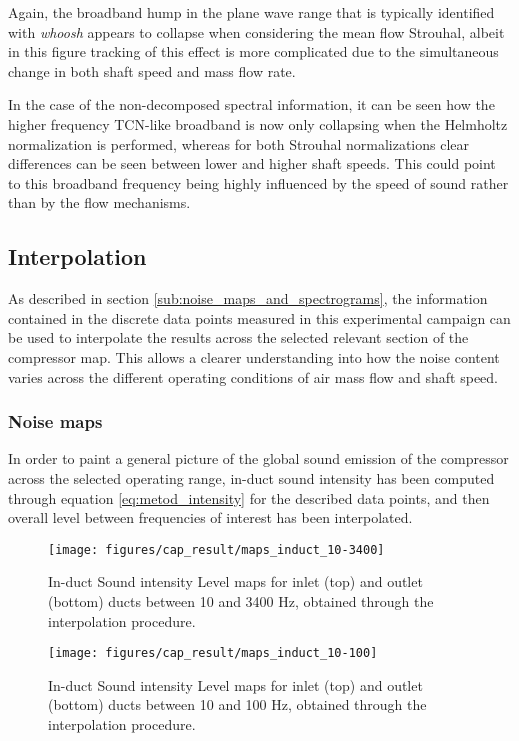 Again, the broadband hump in the plane wave range that is typically identified with \emph{whoosh} appears to collapse when considering the mean flow Strouhal, albeit in this figure tracking of this effect is more complicated due to the simultaneous change in both shaft speed and mass flow rate. 

In the case of the non-decomposed spectral information, it can be seen how the higher frequency TCN-like broadband is now only collapsing when the Helmholtz normalization is performed, whereas for both Strouhal normalizations clear differences can be seen between lower and higher shaft speeds. This could point to this broadband frequency being highly influenced by the speed of sound rather than by the flow mechanisms.

\subsection{Interpolation}

As described in section \ref{sub:noise_maps_and_spectrograms}, the information contained in the discrete data points measured in this experimental campaign can be used to interpolate the results across the selected relevant section of the compressor map. This allows a clearer understanding into how the noise content varies across the different operating conditions of air mass flow and shaft speed.

\subsubsection{Noise maps}

In order to paint a general picture of the global sound emission of the compressor across the selected operating range, in-duct sound intensity has been computed through equation \ref{eq:metod_intensity} for the described data points, and then overall level between frequencies of interest has been interpolated. 

\begin{figure}[tbh!]
\centering
\texttt{[image: figures/cap\_result/maps\_induct\_10-3400]}
\vspace{-2.25cm}
\caption{In-duct Sound intensity Level maps for inlet (top) and outlet (bottom) ducts between 10 and 3400 Hz, obtained through the interpolation procedure.}
\label{fig:maps_induct_10-3400}
\end{figure}

\begin{figure}[tbh!]
\centering
\texttt{[image: figures/cap\_result/maps\_induct\_10-100]}
\vspace{-2.25cm}
\caption{In-duct Sound intensity Level maps for inlet (top) and outlet (bottom) ducts between 10 and 100 Hz, obtained through the interpolation procedure.}
\label{fig:maps_induct_10-100}
\end{figure}

